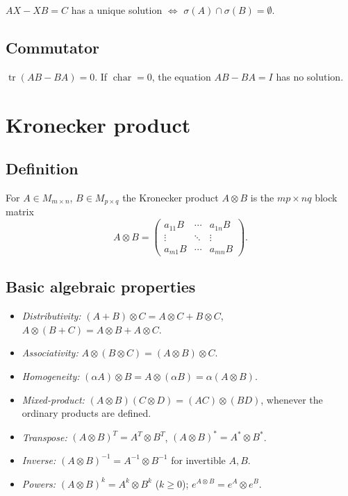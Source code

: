 $AX-XB=C$ has a unique solution $\iff$ $\sigma(A)\cap\sigma(B)=\emptyset$.

\subsection{Commutator}
\label{subsec:commutator}

$\operatorname{tr}(AB-BA)=0$. If $\operatorname{char}=0$, the equation $AB-BA=I$ has no solution.

\medskip

\section{Kronecker product}
\label{sec:kronecker}

\subsection{Definition}
\label{subsec:kronecker-def}

For $A\in M_{m\times n}$, $B\in M_{p\times q}$ the Kronecker product $A\otimes B$ is the $mp\times nq$ block matrix
$$A\otimes B = \begin{pmatrix}
a_{11}B & \cdots & a_{1n}B\\
\vdots & \ddots & \vdots\\
a_{m1}B & \cdots & a_{mn}B
\end{pmatrix}.$$

\medskip

\subsection{Basic algebraic properties}
\label{subsec:kronecker-algebra}

\begin{itemize}
\item \textit{Distributivity:} $(A+B)\otimes C = A\otimes C + B\otimes C$, $A\otimes(B+C)=A\otimes B+A\otimes C$.
\item \textit{Associativity:} $A\otimes(B\otimes C) = (A\otimes B)\otimes C$.
\item \textit{Homogeneity:} $(\alpha A)\otimes B = A\otimes(\alpha B) = \alpha(A\otimes B)$.
\item \textit{Mixed-product:} $(A\otimes B)(C\otimes D) = (AC)\otimes(BD)$, whenever the ordinary products are defined.
\item \textit{Transpose:} $(A\otimes B)^T = A^T\otimes B^T$, $(A\otimes B)^* = A^*\otimes B^*$.
\item \textit{Inverse:} $(A\otimes B)^{-1} = A^{-1}\otimes B^{-1}$ for invertible $A,B$.
\item \textit{Powers:} $(A\otimes B)^k = A^k\otimes B^k$ ($k\ge0$); $e^{A\otimes B}=e^A\otimes e^B$.
\end{itemize}

